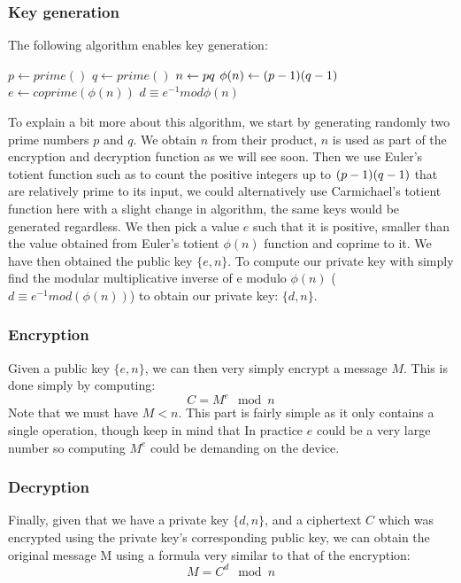 \documentclass[conference]{IEEEtran}
\begin{document}
\subsubsection{Key generation}
The following algorithm enables key generation:
\begin{algorithmic}
\STATE $p \leftarrow prime()$
\STATE $q \leftarrow prime()$
\STATE $n \leftarrow p \* q$
\STATE $\phi (n) \leftarrow (p - 1) \* (q - 1)$
\STATE $e \leftarrow coprime(\phi (n))$
\STATE $d \equiv e^{-1} mod \phi(n)$
\end{algorithmic}
To explain a bit more about this algorithm, we start by generating randomly two prime numbers
$p$ and $q$. We obtain $n$ from their product, $n$ is used as part of the encryption and decryption function
as we will see soon. Then we use Euler's totient function such as to count the positive integers
up to $(p - 1) \* (q - 1)$ that are relatively prime to its input, we could alternatively use Carmichael's totient function here 
with a slight change in algorithm, the same keys would be generated regardless. We then pick a value $e$
such that it is positive, smaller than the value obtained from Euler's totient $\phi(n) $ function and coprime to it.
We have then obtained the public key $\{e,n\}$. To compute our private key with simply find 
the modular multiplicative inverse of e modulo $\phi(n)$ ($d \equiv e^{-1} mod(\phi(n))$) to obtain
our private key: $\{d,n\}$.

\subsubsection{Encryption}
Given a public key $\{e,n\}$, we can then very simply encrypt a message $M$.
This is done simply by computing:
\begin{equation*}
    C = M^{e}\mod n
\end{equation*}
Note that we must have $M < n$.
This part is fairly simple as it only contains a single operation, though keep in mind that
In practice $e$ could be a very large number so computing $M^{e}$ could be demanding on the device.

\subsubsection{Decryption}
Finally, given that we have a private key $\{d,n\}$, and a ciphertext $C$
which was encrypted using the private key's corresponding public key, we can obtain the original
message M using a formula very similar to that of the encryption:
\begin{equation*}
    M = C^{d}\mod n
\end{equation*}
\end{document}
